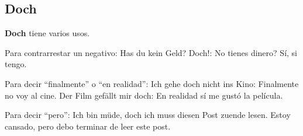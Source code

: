 \subsection{Doch}
\textbf{Doch} tiene varios usos.

Para contrarrestar un negativo:
Has du kein Geld? Doch!: No tienes dinero? Sí, si tengo.

Para decir ``finalmente'' o ``en realidad'':
Ich gehe doch nicht ins Kino: Finalmente no voy al cine.
Der Film gefällt mir doch: En realidad sí me gustó la película.

Para decir ``pero'':
Ich bin müde, doch ich muss diesen Post zuende lesen. Estoy cansado, pero debo terminar de leer este post.
